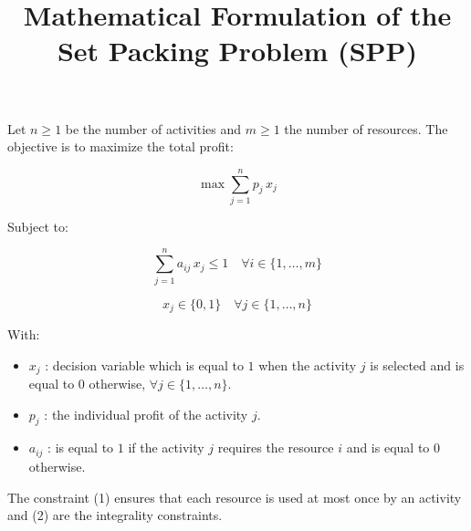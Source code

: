 \documentclass[a4paper,12pt]{article}
\title{Mathematical Formulation of the Set Packing Problem (SPP)}
\date{}
\author{}
\begin{document}
\maketitle

Let $n \ge 1$ be the number of activities and $m \ge 1$ the number of resources.
The objective is to maximize the total profit:



\[
\max \sum_{j=1}^{n}  p_{j} \, x_{j}
\]



Subject to:



\[
\sum_{j=1}^{n} a_{ij} \, x_{j} \leq 1 
\quad \forall i \in \{1,\dots,m\}
\tag{1}
\]


\[
x_{j} \in \{0, 1\}
\quad 
\forall j \in \{1,\dots,n\}
\tag{2}
\]



With:

\begin{itemize}
	\item $x_{j}$ : decision variable which is equal to $1$ when the activity $j$ is selected and is equal to $0$ otherwise, $ \forall j \in \{1,\dots,n\}$.
	
	\item $p_{j}$ : the individual profit of the activity $j$.
	
    \item $a_{ij}$ : is equal to $1$ if the activity  $j$ requires the resource $i$ and is equal to $0$ otherwise.
    
    
\end{itemize}

The constraint (1) ensures that each resource is used at most once by an activity and (2) are the integrality constraints.
\end{document}
